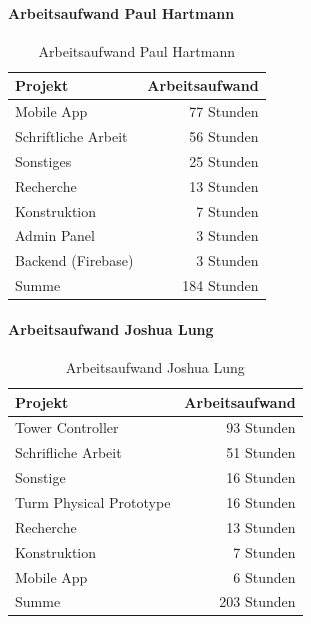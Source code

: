 \paragraph{Arbeitsaufwand Paul Hartmann}

\begin{table}[!h]
  \centering
  \begin{tabular}{lr}
    \toprule
    \textbf{Projekt}    & \textbf{Arbeitsaufwand} \\
    \midrule
    Mobile App          & 77 Stunden              \\
    Schriftliche Arbeit & 56 Stunden              \\
    Sonstiges           & 25 Stunden              \\
    Recherche           & 13 Stunden              \\
    Konstruktion        & 7 Stunden               \\
    Admin Panel         & 3 Stunden               \\
    Backend (Firebase)  & 3 Stunden               \\
    \midrule
    Summe               & 184 Stunden             \\
    \bottomrule
  \end{tabular}
  \caption{Arbeitsaufwand Paul Hartmann}
  \label{tab:zeiterfassung_paul_hartmann}
\end{table}


\paragraph{Arbeitsaufwand Joshua Lung}

\begin{table}[!h]
  \centering
  \begin{tabular}{lr}
    \toprule
    \textbf{Projekt}        & \textbf{Arbeitsaufwand} \\
    \midrule
    Tower Controller        & 93 Stunden              \\
    Schrifliche Arbeit      & 51 Stunden              \\
    Sonstige                & 16 Stunden              \\
    Turm Physical Prototype & 16 Stunden              \\
    Recherche               & 13 Stunden              \\
    Konstruktion            & 7 Stunden               \\
    Mobile App              & 6 Stunden               \\
    \midrule
    Summe                   & 203 Stunden             \\
    \bottomrule
  \end{tabular}
  \caption{Arbeitsaufwand Joshua Lung}
  \label{tab:zeiterfassung_joshua_lung}
\end{table}


